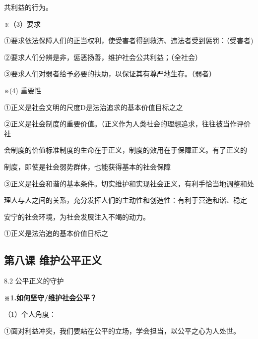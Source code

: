 \documentclass[lang=cn,11pt]{elegantbook}
\newcommand{\daofasym}[1]{{\daofasymbolfont #1}}
\newcommand{\daofasym}[1]{#1}
\begin{document}
共利益的行为。\par

※（3）要求\par

\daofasym{①}要求依法保障人们的正当权利，使受害者得到救济、违法者受到惩罚：（受害者)\par

\daofasym{②}要求人们分辨是非，惩恶扬善，维护社会公共利益；（全社会）\par

\daofasym{③}要求人们对弱者给予必要的扶助，以保证其有尊严地生存。（弱者）\par

※(4) 重要性\par

\daofasym{①}正义是社会文明的尺度D是法治追求的基本价值目标之之\par

\daofasym{②}正义是社会制度的重要价值。（正义作为人类社会的理想追求，往往被当作评价社\par

会制度的价值标准制度的生命在于正义，制度的效用在于保障正义。有了正义的\par

制度，即使是社会弱势群体，也能获得基本的社会保障\par

\daofasym{③}正义是社会和谐的基本条件。切实维护和实现社会正义，有利手恰当地调整和处\par

理人与人之间的关系，充分发挥人们的主动性和创造性：有利于营造和谐、稳定\par

安宁的社会环境，为社会发展注入不竭的动力。\par

\daofasym{①}正义是法治追的基本价值日标之\par

\subsection*{第八课 维护公平正义}

8.2 公平正义的守护\par

\textbf{※1.如何坚守/维护社会公平？}\par

（1）个人角度：\par

\daofasym{①}面对利益冲突，我们要站在公平的立场，学会担当，以公平之心为人处世。\par
\end{document}
